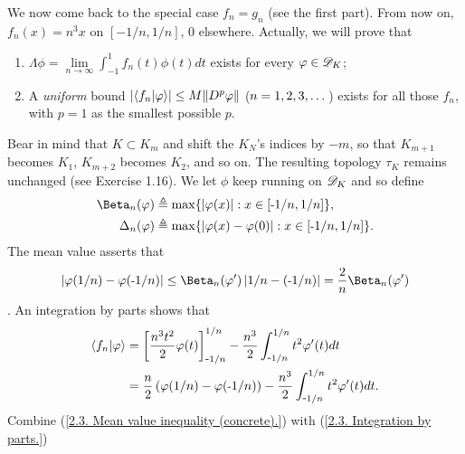 We now come back to the special case $f_n = g_n$ (see the first part). %
From now on, $f_n(x) = n^3 x$ on $[\minus 1/n, 1/n]$, $0$ elsewhere. %
Actually, we will prove that 
%
  \renewcommand{\labelenumi}{(\alph{enumi})}
  \begin{enumerate}
    \item{
        $\Lambda\phi 
          = 
        \underset{n \to \infty}{\lim} \int_{\minus 1}^1 f_{n}(t)\phi(t)dt$ 
      exists for every $\varphi\in{\mathscr D}_{K}$;
    }
    \item{
      A \textit{uniform} bound %
        $\lvert\bra{f_n}\ket{\varphi}\rvert \leq M \| D^p \varphi \|$ %
        ($n=1, 2, 3, \dots$) %
      exists for all those $f_n$, with $p=1$ as the smallest possible $p$.
    }
  \end{enumerate}
  \renewcommand{\labelenumi}{(\roman{enumi})}
%
%
Bear in mind that %
%
  $K \subset K_m$ %
%
and shift the $K_N$'s indices by $\minus m$, so that %
%
  $K_{m+1}$ becomes $K_1$, $K_{m+2}$ becomes $K_2$, and so on. %
%
The resulting topology $\tau_K$ remains unchanged (see Exercise 1.16). %
%
We let $\phi$ keep running on ${\mathscr D}_K$ and so define %
%
  \begin{align}
    \Beta_{n}(\phi) 
      & 
        \Def  \max\set{\magnitude{\phi(x)}}{x \in [\minus 1/n, 1/n]}, \\
    \Delta_{n}(\phi) 
      & 
        \Def  \max\set{\magnitude{\phi(x) - \phi(0)}}{x \in [\minus 1/n, 1/n]}. 
  \end{align}
%
The mean value asserts that 
%
  \begin{align}\label{2.3. Mean value inequality (concrete).}
    \magnitude{ \phi(1/n) - \phi(\minus 1/n)} 
      \leq 
    \Beta_{n}(\phi')\magnitude{1/n - ({\minus}1/n)} 
      = 
    \frac{2}{n} \Beta_{n}(\phi')
  \end{align}.
%
An integration by parts shows that %
%
  \begin{align}\label{2.3. Integration by parts.}
    \bra{f_n}\ket{\varphi}
      & =  
        \left[ \frac{n^3 t^2}{2} \varphi(t) \right]^{1/n}_{\text{\small{-}} 1/n}
        - \frac{n^3}{2} \int_{\text{\small{-}} 1/n}^{1/n} t^{2} \varphi'(t)dt\\ 
      \label{2.3. Equality from integration by parts.}
      & =  
        \frac{n}{2}\left(\varphi(1/n) - \varphi(\text{\small{-}} 1/n)\right)
        - \frac{n^3}{2} \int_{\text{\small{-}} 1/n}^{1/n} t^{2} \varphi'(t)dt.
  \end{align}
Combine %
%
  (\ref{2.3. Mean value inequality (concrete).}) %
%
with %
%
  (\ref{2.3. Integration by parts.}) %
